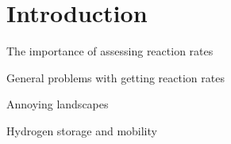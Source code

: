 \chapter{Introduction}
\label{chap:introduction}

\bit
\item The importance of assessing reaction rates
\item General problems with getting reaction rates
\item Annoying landscapes
\item Hydrogen storage and mobility
\eit

\placeholder
